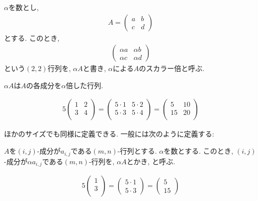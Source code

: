 $\alpha$を数とし,
\begin{align*}
  A=
  \begin{pmatrix}
    a&b\\
    c&d
  \end{pmatrix}
\end{align*}
とする.  このとき,
\begin{align*}
  \begin{pmatrix}
    \alpha a&\alpha b\\
    \alpha c&\alpha d
  \end{pmatrix}
\end{align*}
という$(2,2)$行列を,
$\alpha A$と書き,
$\alpha$による$A$のスカラー倍と呼ぶ.
\begin{remark}
  $\alpha A$は$A$の各成分を$\alpha$倍した行列.
\end{remark}
\begin{example}
  \begin{align*}
  5
  \begin{pmatrix}
    1&2\\
    3&4\\
  \end{pmatrix}
  =
  \begin{pmatrix}
    5\cdot 1&5\cdot 2\\
    5\cdot 3&5\cdot 4\\
  \end{pmatrix}
  =
  \begin{pmatrix}
    5&10\\
    15&20\\
  \end{pmatrix}
  \end{align*}
\end{example}
ほかのサイズでも同様に定義できる.
一般には次のように定義する:
\begin{definition}
  \label{def:op:scalar}
  $A$を$(i,j)$-成分が$a_{i,j}$である$(m,n)$-行列とする.
  $\alpha$を数とする.
  このとき,
  $(i,j)$-成分が$\alpha a_{i,j}$である$(m,n)$-行列を,
  $\alpha A$とかき,
  と呼ぶ.
\end{definition}
\begin{example}
  \begin{align*}
  5
  \begin{pmatrix}
    1\\
    3\\
  \end{pmatrix}
  =
  \begin{pmatrix}
    5\cdot 1\\
    5\cdot 3
  \end{pmatrix}
  =
  \begin{pmatrix}
    5\\
    15
  \end{pmatrix}
  \end{align*}
\end{example}
